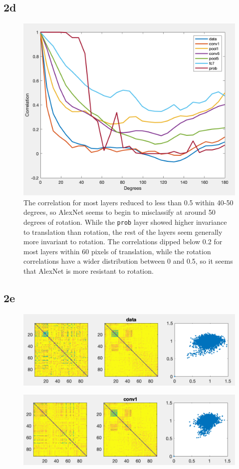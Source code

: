 \documentclass[]{article}
\begin{document}
\subsection*{2d}
\begin{figure}[H]
    \centering
    \includegraphics[width=0.7\linewidth]{problem2D_2.png}
    \caption{The correlation for most layers reduced to less than 0.5 within 40-50 degrees, so AlexNet seems to begin to misclassify at around 50 degrees of rotation. While the \texttt{prob} layer showed higher invariance to translation than rotation, the rest of the layers seem generally more invariant to rotation. The correlations dipped below 0.2 for most layers within 60 pixels of translation, while the rotation correlations have a wider distribution between 0 and 0.5, so it seems that AlexNet is more resistant to rotation.}
    \label{fig:my_label}
\end{figure}

\subsection*{2e}
\begin{figure}[H]
    \centering
    \includegraphics[width=0.7\linewidth]{problem2E_RDMdata.png}
    \label{fig:my_label}
\end{figure}

\begin{figure}[H]
    \centering
    \includegraphics[width=0.7\linewidth]{problem2E_RDMconv1.png}
    \label{fig:my_label}
\end{figure}
\end{document}
